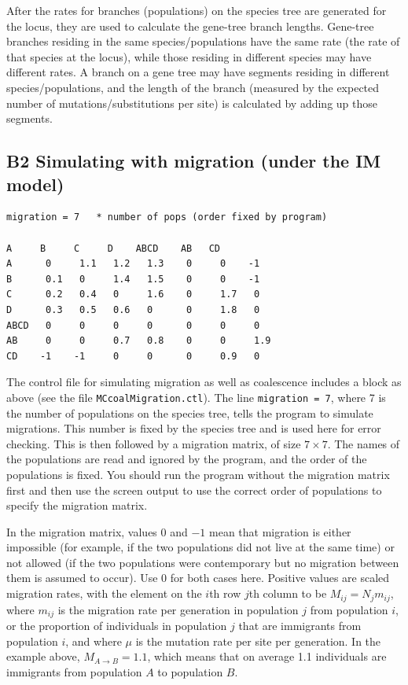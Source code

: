 \documentclass[a4paper]{book}
\numberwithin{equation}{section} \renewcommand{\baselinestretch}{0.55}
\begin{document}
After the rates for branches (populations) on the species tree are
generated for the locus, they are used to calculate the gene-tree
branch lengths.  Gene-tree branches residing in the same
species/populations have the same rate (the rate of that species at
the locus), while those residing in different species may have
different rates.  A branch on a gene tree may have segments residing
in different species/populations, and the length of the branch
(measured by the expected number of mutations/substitutions per site)
is calculated by adding up those segments.


\subsection{B2 Simulating with migration (under the IM model)}

\begin{verbatim}
migration = 7   * number of pops (order fixed by program)

A     B     C     D    ABCD    AB   CD
A      0     1.1   1.2   1.3    0     0    -1
B      0.1   0     1.4   1.5    0     0    -1
C      0.2   0.4   0     1.6    0     1.7   0
D      0.3   0.5   0.6   0      0     1.8   0
ABCD   0     0     0     0      0     0     0
AB     0     0     0.7   0.8    0     0     1.9
CD    -1    -1     0     0      0     0.9   0
\end{verbatim}

The control file for simulating migration as well as coalescence
includes a block as above (see the file \texttt{MCcoalMigration.ctl}).
The line \texttt{migration = 7}, where 7 is the number of populations
on the species tree, tells the program to simulate migrations.  This
number is fixed by the species tree and is used here for error
checking.  This is then followed by a migration matrix, of size
$7\times 7$.  The names of the populations are read and ignored by the
program, and the order of the populations is fixed.  You should run
the program without the migration matrix first and then use the screen
output to use the correct order of populations to specify the
migration matrix.

In the migration matrix, values 0 and $-1$ mean that migration is
either impossible (for example, if the two populations did not live at
the same time) or not allowed (if the two populations were
contemporary but no migration between them is assumed to occur).  Use
0 for both cases here.  Positive values are scaled migration rates,
with the element on the $i$th row $j$th column to be
$M_{ij} = N_j m_{ij}$, where $m_{ij}$ is the migration rate per
generation in population $j$ from population $i$, or the proportion of
individuals in population $j$ that are immigrants from population $i$,
and where $\mu$ is the mutation rate per site per generation. In the
example above, $M_{A\to B} = 1.1$, which means that on average 1.1
individuals are immigrants from population $A$ to population $B$.
\end{document}

